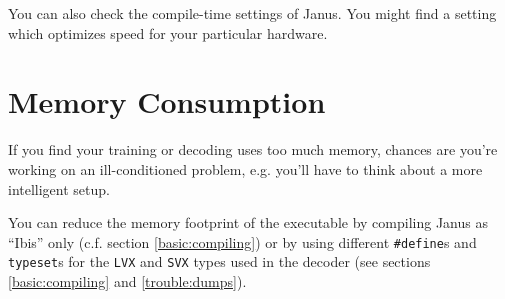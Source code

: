 You can also check the compile-time settings  of Janus. You might find
a setting which optimizes speed for your particular hardware.


\section{Memory Consumption} \label{trouble:memory}

If you find  your training or  decoding uses too much  memory, chances
are you're working on an  ill-conditioned problem, e.g. you'll have to
think about a more intelligent setup.

You  can reduce the memory   footprint of the executable by  compiling
Janus as ``Ibis''   only (c.f.  section \ref{basic:compiling}) or   by
using different   \texttt{\#define}s   and \texttt{typeset}s   for the
\texttt{LVX} and \texttt{SVX} types used in  the decoder (see sections
\ref{basic:compiling} and \ref{trouble:dumps}).


